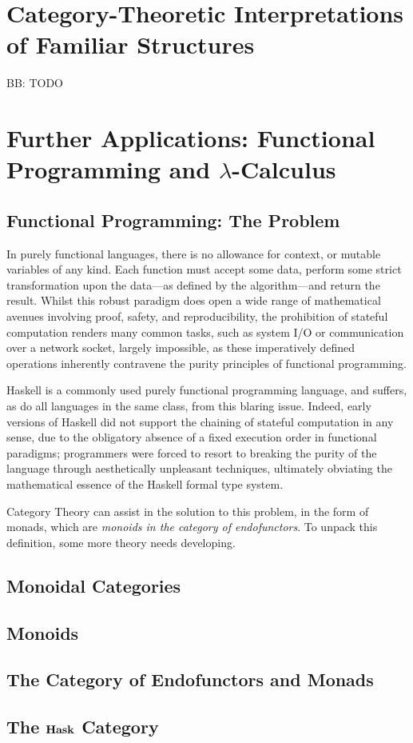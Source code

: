 \documentclass[10pt,a4paper]{amsart}
\begin{document}
\section{Category-Theoretic %
        Interpretations of Familiar Structures}
BB: TODO

\section{Further Applications: %
        Functional Programming and \texorpdfstring{$\lambda$}{Lambda}-Calculus}
\subsection{Functional Programming: The Problem} In purely functional languages,
there is no allowance for context, or mutable variables of any kind. Each
function must accept some data, perform some strict transformation upon the
data---as defined by the algorithm---and return the result. Whilst this robust
paradigm does open a wide range of mathematical avenues involving proof, safety,
and reproducibility, the prohibition of stateful computation renders many common
tasks, such as system I/O or communication over a network socket, largely
impossible, as these imperatively defined operations inherently contravene the
purity principles of functional programming.

Haskell is a commonly used purely functional programming language, and
suffers, as do all languages in the same class, from this blaring issue.
Indeed, early versions of Haskell did not support the chaining of stateful
computation in any sense, due to the obligatory absence of a fixed execution
order in functional paradigms; programmers were forced to resort to breaking the
purity of the language through aesthetically unpleasant techniques, ultimately
obviating the mathematical essence of the Haskell formal type system.

Category Theory can assist in the solution to this problem, in the form of
monads, which are \emph{monoids in the category of endofunctors}. To unpack this
definition, some more theory needs developing.

\subsection{Monoidal Categories}
\subsection{Monoids}
\subsection{The Category of Endofunctors and Monads}
\subsection{The $\operatorname{\text{\textbf{Hask}}}$ Category}

\printbibliography[title=Cited Works]
\end{document}
